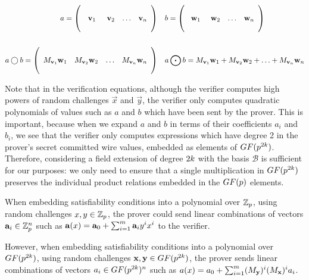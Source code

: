 {\begin{align*}
a = \left(\begin{array}{cccc} \\ \mathbf{v}_1 & \mathbf{v}_2 & \ldots & \mathbf{v}_n \\ \qquad \end{array}\right) &\quad b = \left(\begin{array}{cccc} \\ \mathbf{w}_1 & \mathbf{w}_2 & \ldots & \mathbf{w}_n \\ \qquad \end{array}\right)\\ \\
a \bigcirc b = \left(\begin{array}{cccc} \\ M_{\mathbf{v}_1} \mathbf{w}_1 & M_{\mathbf{v}_2}\mathbf{w}_2 & \ldots & M_{\mathbf{v}_n}\mathbf{w}_n \\ \qquad \end{array}\right) &\quad
a \bigodot b = M_{\mathbf{v}_1} \mathbf{w}_1 + M_{\mathbf{v}_2}\mathbf{w}_2 + \ldots + M_{\mathbf{v}_n}\mathbf{w}_n
\end{align*}

Note that in the verification equations, although the verifier computes high powers of random challenges $\vec{x}$ and $\vec{y}$, the verifier only computes quadratic polynomials of values such as $a$ and $b$ which have been sent by the prover. This is important, because when we expand $a$ and $b$ in terms of their coefficients $a_i$ and $b_i$, we see that the verifier only computes expressions which have degree 2 in the prover's secret committed wire values, embedded as elements of $GF(p^{2k})$. Therefore, considering a field extension of degree $2k$ with the basis $\mathcal{B}$ is sufficient for our purposes: we only need to ensure that a single multiplication in $GF(p^{2k})$ preserves the individual product relations embedded in the $GF(p)$ elements.

When embedding satisfiability conditions into a polynomial over $\mathbb{Z}_p$, using random challenges $x,y \in \mathbb{Z}_p$, the prover could send linear combinations of vectors $\mathbf{a}_i \in \mathbb{Z}_p^n$ such as $ \mathbf{a}(x)=\mathbf{a}_0 + \sum_{i=1}^m \mathbf{a}_{i}y^i x^{i} $
to the verifier.

However, when embedding satisfiability conditions into a polynomial over $GF(p^{2k})$, using random challenges $\mathbf{x},\mathbf{y} \in GF(p^{2k})$, the prover sends linear combinations of vectors $a_i \in GF(p^{2k})^n$ such as
$ a(x)=a_0 + \sum_{i=1}^m (M_{\mathbf{y}})^i (M_{\mathbf{x}})^i a_{i} $.

}
